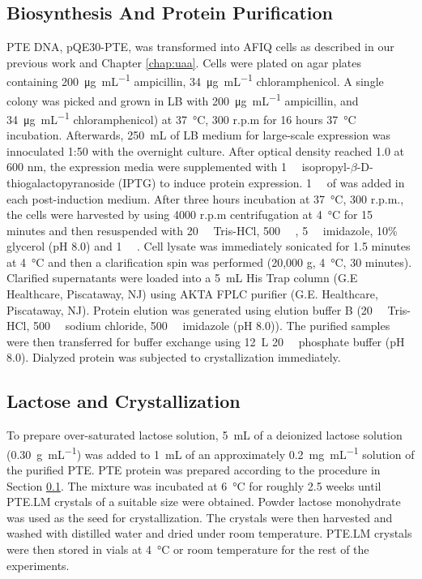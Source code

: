 \begin{refsection}
\subsection{Biosynthesis And Protein Purification}
\label{sec:pte-chap3}

PTE DNA, pQE30-PTE, was transformed into AFIQ cells as described in our previous
work\cite{Yang2014a} and Chapter \ref{chap:uaa}. Cells were plated on agar
plates containing \SI{200}{\ug\per\mL} ampicillin, \SI{34}{\ug\per\mL}
chloramphenicol. A single colony was picked and grown in LB with
\SI{200}{\ug\per\mL} ampicillin, and \SI{34}{\ug\per\mL} chloramphenicol) at
\SI{37}{\celsius}, 300 r.p.m for 16 hours \SI{37}{\celsius} incubation.
Afterwards, \SI{250}{\mL} of LB medium for large-scale expression was
innoculated 1:50 with the overnight culture.  After optical density reached 1.0
at 600 nm, the expression media were supplemented with \SI{1}{\milli\Molar}
isopropyl-$\beta$-D-thiogalactopyranoside (IPTG) to induce protein expression.
\SI{1}{\milli\Molar} of  was added in each post-induction medium.
After three hours incubation at \SI{37}{\celsius}, 300 r.p.m., the cells were
harvested by using 4000 r.p.m centrifugation at \SI{4}{\celsius} for 15 minutes
and then resuspended with \SI{20}{\milli\Molar} Tris-HCl,
\SI{500}{\milli\Molar} , \SI{5}{\milli\Molar} imidazole, 10\% glycerol
(pH 8.0) and \SI{1}{\micro\Molar} . Cell lysate was immediately
sonicated for 1.5 minutes at \SI{4}{\celsius} and then a clarification spin was
performed (20,000 g, \SI{4}{\celsius}, 30 minutes).  Clarified supernatants
were loaded into a \SI{5}{\mL} His Trap column (G.E Healthcare, Piscataway, NJ)
using AKTA FPLC purifier (G.E.  Healthcare, Piscataway, NJ).  Protein elution
was generated using elution buffer B (\SI{20}{\milli\Molar} Tris-HCl,
\SI{500}{\milli\Molar} sodium chloride, \SI{500}{\milli\Molar} imidazole (pH
8.0)).  The purified samples were then transferred for buffer exchange using
\SI{12}{\L} \SI{20}{\milli\Molar} phosphate buffer (pH 8.0).  Dialyzed protein
was subjected to crystallization immediately.

\subsection{Lactose and Crystallization}

To prepare over-saturated lactose solution, \SI{5}{\mL} of a deionized lactose
solution (\SI{0.30}{\gram\per\mL}) was added to \SI{1}{\mL} of an approximately
\SI{0.2}{\mg\per\mL} solution of the purified PTE. PTE protein was prepared
according to the procedure in Section \ref{sec:pte-chap3}. The mixture was
incubated at \SI{6}{\celsius} for roughly 2.5 weeks until PTE.LM crystals of a
suitable size were obtained. Powder lactose monohydrate was used as the seed
for crystallization. The crystals were then harvested and washed with distilled
water and dried under room temperature. PTE.LM crystals were then stored in
vials at \SI{4}{\celsius} or room temperature for the rest of the experiments.


\end{refsection}
